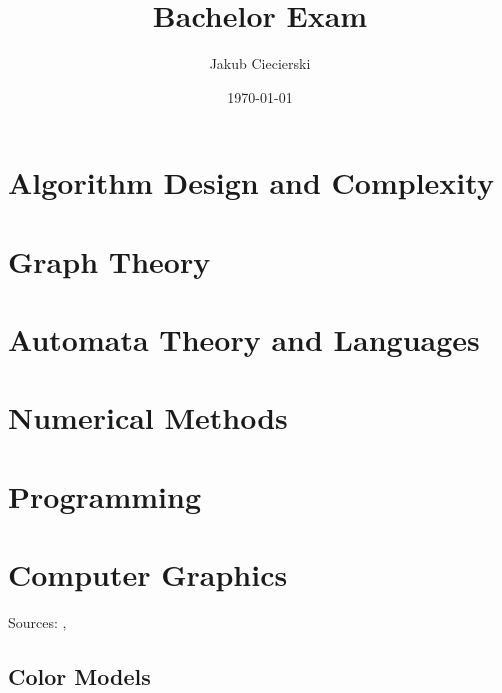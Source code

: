 \documentclass{mini}
\title{Bachelor Exam}
\author{Jakub Ciecierski}
\date{\today}
\begin{document}
\maketitle
\tableofcontents

\chapter{Algorithm Design and Complexity}

\chapter{Graph Theory}

\chapter{Automata Theory and Languages}

\chapter{Numerical Methods}

\chapter{Programming}

\chapter{Computer Graphics}

Sources: \cite{phong}, \cite{lighting}

\section{Color Models}



\end{document}
